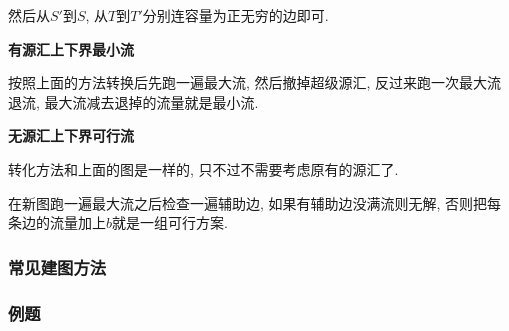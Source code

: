 然后从$S'$到$S$, 从$T$到$T'$分别连容量为正无穷的边即可.

\textbf{有源汇上下界最小流}

按照上面的方法转换后先跑一遍最大流, 然后撤掉超级源汇, 反过来跑一次最大流退流, 最大流减去退掉的流量就是最小流.

\textbf{无源汇上下界可行流}

转化方法和上面的图是一样的, 只不过不需要考虑原有的源汇了.

在新图跑一遍最大流之后检查一遍辅助边, 如果有辅助边没满流则无解, 否则把每条边的流量加上$b$就是一组可行方案.

\subsubsection{常见建图方法}


\subsubsection{例题}
